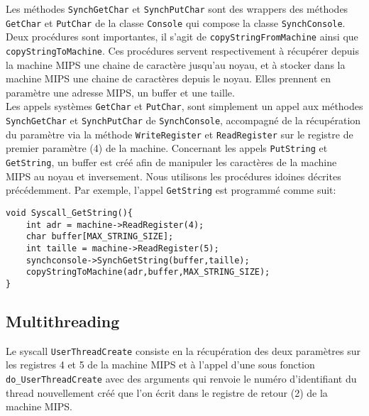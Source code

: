 \documentclass{report}
\begin{document}
Les méthodes \texttt{SynchGetChar} et \texttt{SynchPutChar} sont des wrappers des méthodes \texttt{GetChar} et \texttt{PutChar} de la classe \texttt{Console} qui compose la classe \texttt{SynchConsole}.\\

Deux procédures sont importantes, il s'agit de \texttt{copyStringFromMachine} ainsi que \texttt{copyStringToMachine}. Ces procédures servent respectivement à récupérer depuis la machine MIPS une chaine de caractère jusqu'au noyau, et à stocker dans la machine MIPS une chaine de caractères depuis le noyau. Elles prennent en paramètre une adresse MIPS, un buffer et une taille.\\

Les appels systèmes \texttt{GetChar} et \texttt{PutChar}, sont simplement un appel aux méthodes \texttt{SynchGetChar} et \texttt{SynchPutChar} de \texttt{SynchConsole}, accompagné de la récupération du paramètre via la méthode \texttt{WriteRegister} et \texttt{ReadRegister} sur le registre de premier paramètre (4) de la machine. Concernant les appels \texttt{PutString} et \texttt{GetString}, un buffer est créé afin de manipuler les caractères de la machine MIPS au noyau et inversement. Nous utilisons les procédures idoines décrites précédemment. Par exemple, l'appel \texttt{GetString} est programmé comme suit:
\begin{verbatim}
void Syscall_GetString(){
    int adr = machine->ReadRegister(4); 
    char buffer[MAX_STRING_SIZE];
    int taille = machine->ReadRegister(5);
    synchconsole->SynchGetString(buffer,taille);
    copyStringToMachine(adr,buffer,MAX_STRING_SIZE); 
}
\end{verbatim}

\subsection*{Multithreading}
Le syscall \texttt{UserThreadCreate} consiste en la récupération des deux paramètres sur les registres 4 et 5 de la machine MIPS et à l'appel d'une sous fonction \texttt{do\_UserThreadCreate} avec des arguments qui renvoie le numéro d'identifiant du thread nouvellement créé que l'on écrit dans le registre de retour (2) de la machine MIPS.\\
\end{document}
